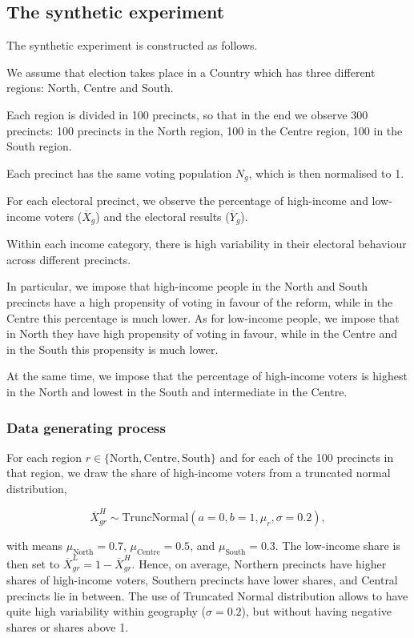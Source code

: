 \subsection{The synthetic experiment}

The synthetic experiment is constructed as follows.

We assume that election takes place in a Country which has three different regions: North, Centre and South.

Each region is divided in 100 precincts, so that in the end we observe 300 precincts: 100 precincts in the North region, 100 in the Centre region, 100 in the South region.

Each precinct has the same voting population $N_g$, which is then normalised to 1.

For each electoral precinct, we observe the percentage of high-income and low-income voters ($\overline{X}_g$) and the electoral results ($\overline{Y}_g$).

Within each income category, there is high variability in their electoral behaviour across different precincts.

In particular, we impose that high-income people in the North and South precincts have a high propensity of voting in favour of the reform, while in the Centre this percentage is much lower.
As for low-income people, we impose that in North they have high propensity of voting in favour, while in the Centre and in the South this propensity is much lower.

At the same time, we impose that the percentage of high-income voters is highest in the North and lowest in the South and intermediate in the Centre.

\subsubsection{Data generating process}

For each region $r \in \{\text{North}, \text{Centre}, \text{South}\}$ and for each of the 100 precincts in that region, we draw the share of high-income voters from a truncated normal distribution,

\begin{equation*}
\overline{X}_{gr}^{H} \sim \text{TruncNormal}(a=0, b=1, \mu_r, \sigma=0.2),
\end{equation*}

with means $\mu_{\text{North}}=0.7$, $\mu_{\text{Centre}}=0.5$, and $\mu_{\text{South}}=0.3$. The low-income share is then set to $\overline{X}_{gr}^{L}=1-\overline{X}_{gr}^{H}$. Hence, on average, Northern precincts have higher shares of high-income voters, Southern precincts have lower shares, and Central precincts lie in between.
The use of Truncated Normal distribution allows to have quite high variability within geography ($\sigma = 0.2$), but without having negative shares or shares above 1.

